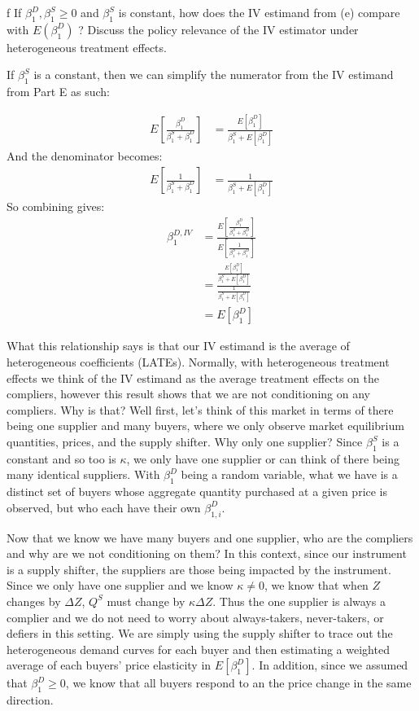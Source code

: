 \documentclass{article}
\begin{document}
\begin{problem}{f}
If $\beta_{1}^{D}, \beta_{1}^{S} \geq 0$ and $\beta_{1}^{S}$ is constant, how does the IV estimand from (e) compare with $E\left(\beta_{1}^{D}\right)$ ? Discuss the policy relevance of the IV estimator under heterogeneous treatment effects.
\end{problem}
\begin{solution}
If $\beta_1^S$ is a constant, then we can simplify the numerator from the IV estimand from Part E as such:

\begin{align*}
    E\left [ \frac{\beta_1^D}{\beta_1^S+\beta_1^D} \right] &=  \frac{E[\beta_1^D]}{\beta_1^S+E[\beta_1^D]}
\end{align*}
And the denominator becomes:
\begin{align*}
    E\left[ \frac{1}{\beta_1^S+\beta_1^D}\right] &=  \frac{1}{\beta_1^S+E[\beta_1^D]}
\end{align*}
So combining gives:
\begin{align*}
    \beta_1^{D,IV} &= \frac{E\left [ \frac{\beta_1^D}{\beta_1^S+\beta_1^D} \right]}{E\left[ \frac{1}{\beta_1^S+\beta_1^D}\right]} \tag{Part E answer} \\
    &=\frac{\frac{E[\beta_1^D]}{\beta_1^S+E[\beta_1^D]}}{\frac{1}{\beta_1^S+E[\beta_1^D]}} \\
    &= E[\beta_1^D]
\end{align*}
\end{solution}
What this relationship says is that our IV estimand is the average of heterogeneous coefficients (LATEs). Normally, with heterogeneous treatment effects we think of the IV estimand as the average treatment effects on the compliers, however this result shows that we are not conditioning on any compliers. Why is that? Well first, let's think of this market in terms of there being one supplier and many buyers, where we only observe market equilibrium quantities, prices, and the supply shifter. Why only one supplier? Since $\beta_1^S$ is a constant and so too is $\kappa$, we only have one supplier or can think of there being many identical suppliers. With $\beta_1^D$ being a random variable, what we have is a distinct set of buyers whose aggregate quantity purchased at a given price is observed, but who each have their own $\beta_{1,i}^D$. 

Now that we know we have many buyers and one supplier, who are the compliers and why are we not conditioning on them? In this context, since our instrument is a supply shifter, the suppliers are those being impacted by the instrument. Since we only have one supplier and we know $\kappa\neq 0$, we know that when $Z$ changes by $\Delta Z$, $Q^S$ must change by $\kappa \Delta Z$. Thus the one supplier is always a complier and we do not need to worry about always-takers, never-takers, or defiers in this setting. We are simply using the supply shifter to trace out the heterogeneous demand curves for each buyer and then estimating a weighted average of each buyers' price elasticity in $E[\beta_1^D]$. In addition, since we assumed that $\beta_1^D \geq 0$, we know that all buyers respond to an the price change in the same direction.
\end{document}
